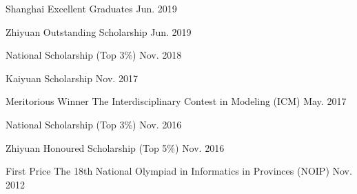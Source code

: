
\begin{cvhonors}

  \cvhonortop
	{Shanghai Excellent Graduates} %
	{} %
	{} %
	{Jun. 2019} %

  \cvhonortop
	{Zhiyuan Outstanding Scholarship} %
	{} %
	{} %
	{Jun. 2019} %

  \cvhonortop
	{National Scholarship} %
	{(Top 3\%)} %
	{} %
	{Nov. 2018} %

  \cvhonortop
	{Kaiyuan Scholarship} %
	{} %
	{} %
	{Nov. 2017} %

  \cvhonor
    {Meritorious Winner} %
    {The Interdisciplinary Contest in Modeling (ICM)} %
    {} %
    {May. 2017} %

  \cvhonortop
    {National Scholarship } %
    {(Top 3\%)} %
    {} %
    {Nov. 2016} %

  \cvhonortop
    {Zhiyuan Honoured Scholarship} %
    {(Top 5\%)} %
    {} %
    {Nov. 2016} %

  \cvhonor
    {First Price} %
    {The 18th National Olympiad in Informatics in Provinces (NOIP)} %
    {} %
    {Nov. 2012} %


\end{cvhonors}
